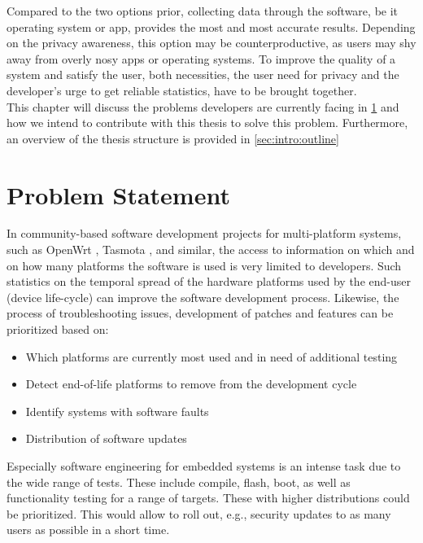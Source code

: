 Compared to the two options prior, collecting data through the software, be it operating system or app, provides the most and most accurate results. Depending on the privacy awareness, this option may be counterproductive, as users may shy away from overly nosy apps or operating systems. To improve the quality of a system and satisfy the user, both necessities, the user need for privacy and the developer's urge to get reliable statistics, have to be brought together.\\

This chapter will discuss the problems developers are currently facing in \ref{sec:intro:probstatement} and how
we intend to contribute with this thesis to solve this problem. Furthermore, an 
overview of the thesis structure is provided in \ref{sec:intro:outline}




\section{Problem Statement}
\label{sec:intro:probstatement}
%
In community-based software development projects for multi-platform systems, such as
OpenWrt \cite{brown_welcome_2016}, Tasmota \cite{tasmota_news_nodate}, and similar, the access to information on which and on how many platforms
the software is used is very limited to developers.
Such statistics on the temporal spread of the hardware platforms used by
the end-user (device life-cycle) can improve the software development process.
Likewise, the process of troubleshooting issues, development of patches and features can be prioritized based on:
\begin{itemize}
    \item Which platforms are currently most used and in need of additional testing
    \item Detect end-of-life platforms to remove from the development cycle
    \item Identify systems with software faults
    \item Distribution of software updates
\end{itemize}

Especially software engineering for embedded systems is an intense task due to the wide range of tests.
These include compile, flash, boot, as well as functionality testing for a range of targets. These with higher distributions could be prioritized.
This would allow to roll out, e.g., security updates to as many users as possible in a short time.\\

